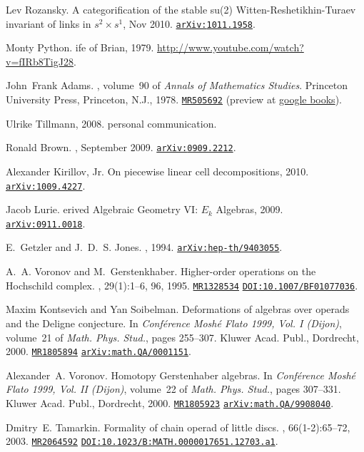 \documentclass{pnastwo}
\newcommand{\arxiv}[1]{\href{http://arxiv.org/abs/#1}{\tt arXiv:\nolinkurl{#1}}}
\newcommand{\doi}[1]{\href{http://dx.doi.org/#1}{{\tt DOI:#1}}}
\newcommand{\mathscinet}[1]{\href{http://www.ams.org/mathscinet-getitem?mr=#1}{\tt #1}}
\newcommand{\googlebooks}[1]{(preview at \href{http://books.google.com/books?id=#1}{google books})}
\begin{document}
\begin{article}
\begin{thebibliography}{10}
Lev Rozansky.
\newblock A categorification of the stable su(2)
  {W}itten-{R}eshetikhin-{T}uraev invariant of links in $s^2 \times s^1$, Nov
  2010.
\newblock \arxiv{1011.1958}.

Monty Python.
ife of {B}rian, 1979.
\newblock \url{http://www.youtube.com/watch?v=fIRb8TigJ28}.

John~Frank Adams.
, volume~90 of {\em Annals of Mathematics
  Studies}.
\newblock Princeton University Press, Princeton, N.J., 1978.
\newblock \mathscinet{MR505692} \googlebooks{e2rYkg9lGnsC}.

Ulrike Tillmann, 2008.
\newblock personal communication.

Ronald {Brown}.
, September 2009.
\newblock \arxiv{0909.2212}.

Alexander Kirillov, Jr.
\newblock On piecewise linear cell decompositions, 2010.
\newblock \arxiv{1009.4227}.

Jacob Lurie.
erived {A}lgebraic {G}eometry {VI}: {$E_k$} {A}lgebras, 2009.
\newblock \arxiv{0911.0018}.

E.~Getzler and J.~D.~S. Jones.
, 1994.
\newblock \arxiv{hep-th/9403055}.

A.~A. Voronov and M.~Gerstenkhaber.
\newblock Higher-order operations on the {H}ochschild complex.
, 29(1):1--6, 96, 1995.
\newblock \mathscinet{MR1328534} \doi{10.1007/BF01077036}.

Maxim Kontsevich and Yan Soibelman.
\newblock Deformations of algebras over operads and the {D}eligne conjecture.
\newblock In {\em Conf\'erence {M}osh\'e {F}lato 1999, {V}ol. {I} ({D}ijon)},
  volume~21 of {\em Math. Phys. Stud.}, pages 255--307. Kluwer Acad. Publ.,
  Dordrecht, 2000.
\newblock \mathscinet{MR1805894} \arxiv{math.QA/0001151}.

Alexander~A. Voronov.
\newblock Homotopy {G}erstenhaber algebras.
\newblock In {\em Conf\'erence {M}osh\'e {F}lato 1999, {V}ol. {II} ({D}ijon)},
  volume~22 of {\em Math. Phys. Stud.}, pages 307--331. Kluwer Acad. Publ.,
  Dordrecht, 2000.
\newblock \mathscinet{MR1805923} \arxiv{math.QA/9908040}.

Dmitry~E. Tamarkin.
\newblock Formality of chain operad of little discs.
, 66(1-2):65--72, 2003.
\newblock \mathscinet{MR2064592} \doi{10.1023/B:MATH.0000017651.12703.a1}.

\end{thebibliography}



\end{article}
\end{document}
